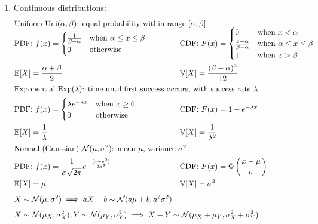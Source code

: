 \documentclass{article}
\begin{document}
\begin{enumerate}
	\item Continuous distributions:
		\vspace*{-\baselineskip}
		\begin{align*}
			\intertext{Uniform $\mathrm{Uni}(\alpha,\beta)$: equal probability within range $[\alpha,\beta]$\vspace*{-0.5\baselineskip}}
			&\text{PDF: }f(x)=\begin{cases}
				\frac{1}{\beta-\alpha} &\text{when $\alpha\leq x\leq\beta$} \\
				0 &\text{otherwise}
			\end{cases} &&\hspace*{-3.9cm}\text{CDF: }F(x)=\begin{cases}
				0 &\text{when $x<\alpha$} \\
				\frac{x-\alpha}{\beta-\alpha} &\text{when $\alpha\leq x\leq\beta$} \\
				1 &\text{when $x>\beta$}
			\end{cases} \\
			&\mathbb{E}[X]=\frac{\alpha+\beta}{2} &&\hspace*{-3.9cm}\mathbb{V}[X]=\frac{(\beta-\alpha)^2}{12} \\
			\intertext{Exponential $\mathrm{Exp}(\lambda)$: time until first success occurs, with success rate $\lambda$}
			&\text{PDF: }f(x)=\begin{cases}
				\lambda e^{-\lambda x} &\text{when $x\geq0$} \\
				0 &\text{otherwise}
			\end{cases} &&\hspace*{-3.9cm}\text{CDF: }F(x)=1-e^{-\lambda x} \\
			&\mathbb{E}[X]=\frac{1}{\lambda} &&\hspace*{-3.9cm}\mathbb{V}[X]=\frac{1}{\lambda^2} \\
			\intertext{Normal (Gaussian) $\mathcal{N}(\mu,\sigma^2)$: mean $\mu$, variance $\sigma^2$}
			&\text{PDF: }f(x)=\frac{1}{\sigma\sqrt{2\pi}}e^{-\frac{(x-\mu^2)}{2\sigma^2}}&&\hspace*{-3.9cm}\text{CDF: }F(x)=\Phi\left(\frac{x-\mu}{\sigma}\right) \\
			&\mathbb{E}[X]=\mu &&\hspace*{-3.9cm}\mathbb{V}[X]=\sigma^2 \\[0.25\baselineskip]
			&X\sim\mathcal{N}(\mu,\sigma^2)\implies aX+b\sim\mathcal{N}(a\mu+b,a^2\sigma^2) \\[0.25\baselineskip]
			&X\sim\mathcal{N}(\mu_X,\sigma_X^2),Y\sim\mathcal{N}(\mu_Y,\sigma_Y^2)\implies X+Y\sim\mathcal{N}(\mu_X+\mu_Y,\sigma_X^2+\sigma_Y^2)
		\end{align*}
	

\end{enumerate}
\end{document}
